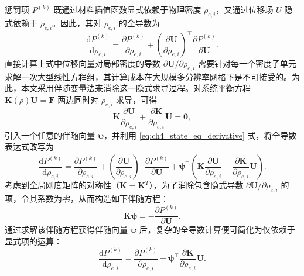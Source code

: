 惩罚项 $P^{(k)}$ 既通过材料插值函数显式依赖于物理密度 $\rho_{e,i}$，又通过位移场 $U$ 隐式依赖于 $\rho_{e,i}$。因此，其对 $\rho_{e,i}$ 的全导数为
\[
\frac{\mathrm{d}P^{(k)}}{\mathrm{d}\rho_{e,i}} = \frac{\partial P^{(k)}}{\partial\rho_{e,i}} + \left(\frac{\partial \boldsymbol{U}}{\partial\rho_{e,i}}\right)^{\top}\frac{\partial P^{(k)}}{\partial \boldsymbol{U}}.
\]
直接计算上式中位移向量对局部密度的导数 $\partial \boldsymbol{U}/\partial\rho_{e,i}$ 需要针对每一个密度子单元求解一次大型线性方程组，其计算成本在大规模多分辨率网格下是不可接受的。为此，本文采用伴随变量法来消除这一隐式求导过程。对系统平衡方程 $\boldsymbol{K}(\rho)\boldsymbol{U}=\boldsymbol{F}$ 两边同时对 $\rho_{e,i}$ 求导，可得
\begin{equation}
	\boldsymbol{K}\frac{\partial \boldsymbol{U}}{\partial\rho_{e,i}} + \frac{\partial \boldsymbol{K}}{\partial\rho_{e,i}}\boldsymbol{U} = \boldsymbol{0},
	\label{eq:ch4_state_eq_derivative}
\end{equation}
引入一个任意的伴随向量 $\boldsymbol{\psi}$，并利用 \eqref{eq:ch4_state_eq_derivative} 式，将全导数表达式改写为
\[
\frac{\mathrm{d} P^{(k)}}{\mathrm{d} \rho_{e,i}} = \frac{\partial P^{(k)}}{\partial \rho_{e,i}} + \left( \frac{\partial \boldsymbol{U}}{\partial \rho_{e,i}} \right)^{\!\top} \frac{\partial P^{(k)}}{\partial \boldsymbol{U}} + \boldsymbol{\psi}^{\top} \left( \boldsymbol{K} \frac{\partial \boldsymbol{U}}{\partial \rho_{e,i}} + \frac{\partial \boldsymbol{K}}{\partial \rho_{e,i}} \boldsymbol{U} \right).
\]
考虑到全局刚度矩阵的对称性（$\boldsymbol{K} = \boldsymbol{K}^T$），为了消除包含隐式导数 $\partial \boldsymbol{U}/\partial\rho_{e,i}$ 的项，令其系数为零，从而构造如下伴随方程：
\begin{equation} \label{eq:ch4_adjoint_equation}
	\boldsymbol{K}\boldsymbol{\psi} = -\frac{\partial P^{(k)}}{\partial \boldsymbol{U}}.
\end{equation}
通过求解该伴随方程获得伴随向量 $\boldsymbol{\psi}$ 后，复杂的全导数计算便可简化为仅依赖于显式项的运算：
\[
\frac{\mathrm{d}P^{(k)}}{\mathrm{d}\rho_{e,i}} = \frac{\partial P^{(k)}}{\partial\rho_{e,i}} + \boldsymbol{\psi}^{\top}\frac{\partial \boldsymbol{K}}{\partial\rho_{e,i}}\boldsymbol{U}.
\]

